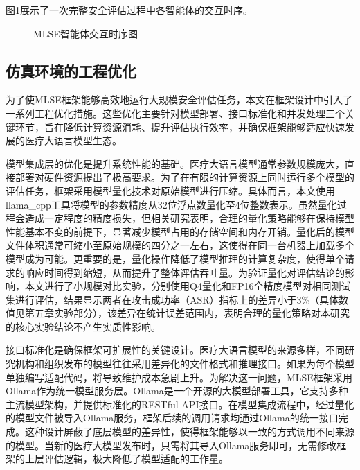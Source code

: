 图\ref{fig:agent_interaction}展示了一次完整安全评估过程中各智能体的交互时序。

\begin{figure}[htbp]
\centering
{}
\caption{MLSE智能体交互时序图}
\label{fig:agent_interaction}
\end{figure}

\subsection{仿真环境的工程优化}
\label{subsec:engineering_optimization}

为了使MLSE框架能够高效地运行大规模安全评估任务，本文在框架设计中引入了一系列工程优化措施。这些优化主要针对模型部署、接口标准化和并发处理三个关键环节，旨在降低计算资源消耗、提升评估执行效率，并确保框架能够适应快速发展的医疗大语言模型生态。

模型集成层的优化是提升系统性能的基础。医疗大语言模型通常参数规模庞大，直接部署对硬件资源提出了极高要求。为了在有限的计算资源上同时运行多个模型的评估任务，框架采用模型量化技术对原始模型进行压缩。具体而言，本文使用llama\_cpp工具将模型的参数精度从32位浮点数量化至4位整数表示\cite{llamacpp2024}。虽然量化过程会造成一定程度的精度损失，但相关研究表明，合理的量化策略能够在保持模型性能基本不变的前提下，显著减少模型占用的存储空间和内存开销。量化后的模型文件体积通常可缩小至原始规模的四分之一左右，这使得在同一台机器上加载多个模型成为可能。更重要的是，量化操作降低了模型推理的计算复杂度，使得单个请求的响应时间得到缩短，从而提升了整体评估吞吐量。为验证量化对评估结论的影响，本文进行了小规模对比实验，分别使用Q4量化和FP16全精度模型对相同测试集进行评估，结果显示两者在攻击成功率（ASR）指标上的差异小于3\%（具体数值见第五章实验部分），该差异在统计误差范围内，表明合理的量化策略对本研究的核心实验结论不产生实质性影响。

接口标准化是确保框架可扩展性的关键设计。医疗大语言模型的来源多样，不同研究机构和组织发布的模型往往采用差异化的文件格式和推理接口。如果为每个模型单独编写适配代码，将导致维护成本急剧上升。为解决这一问题，MLSE框架采用Ollama作为统一模型服务层\cite{ollama2024}。Ollama是一个开源的大模型部署工具，它支持多种主流模型架构，并提供标准化的RESTful API接口。在模型集成流程中，经过量化的模型文件被导入Ollama服务，框架后续的调用请求均通过Ollama的统一接口完成。这种设计屏蔽了底层模型的差异性，使得框架能够以一致的方式调用不同来源的模型。当新的医疗大模型发布时，只需将其导入Ollama服务即可，无需修改框架的上层评估逻辑，极大降低了模型适配的工作量。

